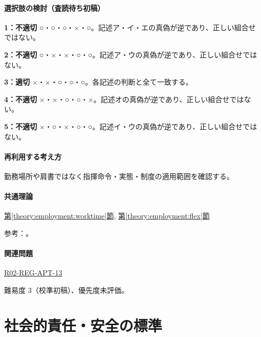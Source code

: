 \paragraph{選択肢の検討（査読待ち初稿）}\mbox{}\par

\noindent\textbf{1：不適切} ○・○・○・×・○。記述ア・イ・エの真偽が逆であり、正しい組合せではない。\par

\noindent\textbf{2：不適切} ○・×・×・○・○。記述ア・ウの真偽が逆であり、正しい組合せではない。\par

\noindent\textbf{3：適切} ×・×・○・○・○。各記述の判断と全て一致する。\par

\noindent\textbf{4：不適切} ×・×・○・○・×。記述オの真偽が逆であり、正しい組合せではない。\par

\noindent\textbf{5：不適切} ×・○・×・○・○。記述イ・ウの真偽が逆であり、正しい組合せではない。\par

\paragraph{再利用する考え方} 勤務場所や肩書ではなく指揮命令・実態・制度の適用範囲を確認する。

\paragraph{共通理論} \hyperref[theory:employment:worktime]{第\ref*{theory:employment:worktime}節}, \hyperref[theory:employment:flex]{第\ref*{theory:employment:flex}節}

\par 参考：\cite{employment_hours2017,employment_manager2008,employment_reform2018,employment_worklife2010}。

\paragraph{関連問題} \hyperref[q:r02-reg-apt-13]{R02-REG-APT-13}

\par 難易度 3（校準初稿）、優先度未評価。

\section{社会的責任・安全の標準}

